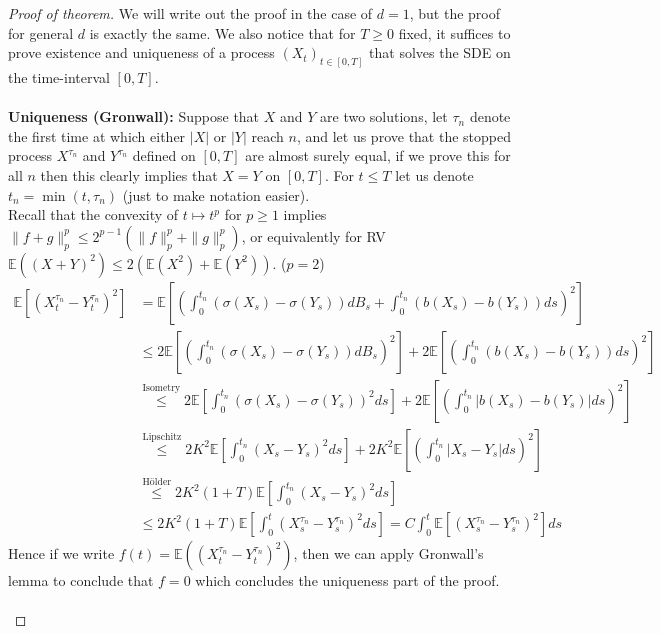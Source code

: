 \documentclass[../mainfile.tex]{subfiles}
\begin{document}
\begin{proof}[Proof of theorem] We will write out the proof in the case of $d=1$, but the proof for general $d$ is exactly the same. We also notice that for $T \geq 0$ fixed, it suffices to prove existence and uniqueness of a process $(X_t)_{t \in [0,T]}$ that solves the SDE on the time-interval $[0,T]$. 
\\
\\
\textbf{Uniqueness (Gronwall):} Suppose that $X$ and $Y$ are two solutions, let $\tau_n$ denote the first time at which either $|X|$ or $|Y|$ reach $n$, and let us prove that the stopped process $X^{\tau_n}$ and $Y^{\tau_n}$ defined on $[0,T]$ are almost surely equal, if we prove this for all $n$ then this clearly implies that $X=Y$ on $[0,T]$. For $t \leq T$ let us denote $t_n= \min(t, \tau_n)$ (just to make notation easier). 
\\
Recall that the convexity of $t \mapsto t^p$ for $p \geq 1$ implies $\|f+g\|_p^p \leq 2^{p-1} (\|f\|_p^p + \|g\|_p^p)$, or equivalently for RV $\mathbb{E}((X+Y)^2) \leq 2 (\mathbb{E}(X^2) +\mathbb{E}(Y^2))$. ($p=2$)
\begin{align*}
\mathbb{E}[(X_t^{\tau_n}-Y_t^{\tau_n})^2] &=\mathbb{E} \left[ \left( \int_0^{t_n}( \sigma(X_s)- \sigma(Y_s))dB_s + \int_0^{t_n} (b(X_s)-b(Y_s))ds \right)^2 \right] \\
& \leq 2 \mathbb{E}\left[ \left( \int_0^{t_n}( \sigma(X_s)-\sigma(Y_s)) dB_s\right)^2\right] + 2 \mathbb{E} \left[ \left( \int_0^{t_n} (b(X_s)-b(Y_s))ds\right)^2\right] \\
 &\overset{\text{Isometry}}{\leq} 2 \mathbb{E}\left[ \int_0^{t_n}( \sigma(X_s)-\sigma(Y_s))^2 ds\right] + 2 \mathbb{E} \left[ \left( \int_0^{t_n} |b(X_s)-b(Y_s)| ds \right)^2 \right] \\
& \overset{\text{Lipschitz}}\leq 2K^2 \mathbb{E} \left[ \int_0^{t_n} (X_s-Y_s)^2 ds \right] + 2K^2 \mathbb{E}\left[ \left( \int_0^{t_n} |X_s-Y_s| ds \right)^2 \right] \\
& \overset{\text{Hölder}}\leq 2K^2(1+T) \mathbb{E}\left[ \int_0^{t_n} (X_s-Y_s)^2 ds\right] \\
& \leq 2K^2 (1+T) \mathbb{E} \left[ \int_0^t( X_s^{\tau_n}- Y_s^{\tau_n})^2 ds\right] = C \int_0^t \mathbb{E}[(X_s^{\tau_n}-Y_s^{\tau_n})^2] ds 
\end{align*}
\newpage
Hence if we write $f(t) = \mathbb{E}((X_t^{\tau_n}-Y_t^{\tau_n})^2)$, then we can apply Gronwall's lemma to conclude that $f=0$ which concludes the uniqueness part of the proof.
\\\\

\end{proof}
\end{document}
